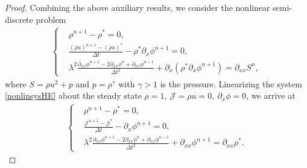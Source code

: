 \documentclass[letterpaper,10pt]{article}
\numberwithin{equation}{section}
\numberwithin{figure}{section}
\numberwithin{table}{section}
\begin{document}
\begin{proof}
Combining the above auxiliary results, we consider the nonlinear semi-discrete problem
\begin{align}\label{nonlinsysHE}
    \left\{
        \begin{aligned}
            &\rho^{n+1}-\rho^*=0,\\
            &\frac{(\rho u)^{n+1}-(\rho u)^*}{\Delta t}-\rho^*\partial_x\phi^{n+1}=0,\\
            &\lambda^2\frac{\partial_{xx}\phi^{n+1}-2\partial_{xx}\phi^n+\partial_{xx}\phi^{n-1}}{\Delta t^2}+\partial_x(\rho^*\partial_x\phi^{n+1})=\partial_{xx}S^n,
        \end{aligned}
    \right.
\end{align}
where $S=\rho u^2+p$ and $p=\rho^{\gamma}$ with $\gamma>1$ is the pressure.
Linearizing the system \eqref{nonlinsysHE} about the steady state $\rho=1,~\mathcal{J}=\rho u=0,~\partial_x\phi=0$, we arrive at
\begin{align}
    \left\{
        \begin{aligned}
            &\rho^{n+1}-\rho^*=0,\\
            &\frac{\mathcal{J}^{n+1}-\mathcal{J}^*}{\Delta t}-\partial_x\phi^{n+1}=0,\\
            &\lambda^2\frac{\partial_{xx}\phi^{n+1}-2\partial_{xx}\phi^n+\partial_{xx}\phi^{n-1}}{\Delta t^2}+\partial_{xx}\phi^{n+1}=\partial_{xx}\rho^*.
        \end{aligned}
    \right.
\end{align}


\end{proof}
\end{document}
